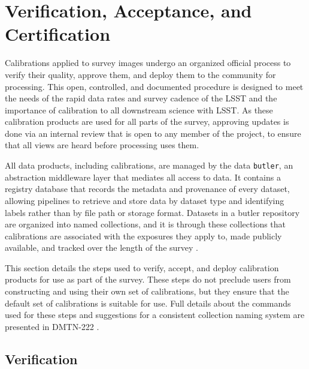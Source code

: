 \section{Verification, Acceptance, and Certification} \label{sec:verify-accept-certify}

Calibrations applied to survey images undergo an organized official process to verify their quality, approve them, and deploy them to the community for processing. This open, controlled, and documented procedure is designed to meet the needs of the rapid data rates and survey cadence of the LSST and the importance of calibration to all downstream science with LSST.
As these calibration products are used for all parts of the survey, approving updates is done via an internal review that is open to any member of the project, to ensure that all views are heard before processing uses them.

All data products, including calibrations, are managed by the data \texttt{butler}, an abstraction middleware layer that mediates all access to data. It contains a registry database that records the metadata and provenance of every dataset, allowing pipelines to retrieve and store data by dataset type and identifying labels rather than by file path or storage format.
Datasets in a butler repository are organized into named collections, and it is through these collections that calibrations are associated with the exposures they apply to, made publicly available, and tracked over the length of the survey \citep[see][for details]{2022SPIE12189E..11J}.

This section details the steps used to verify, accept, and deploy calibration products for use as part of the survey.
These steps do not preclude users from constructing and using their own set of calibrations, but they ensure that the default set of calibrations is suitable for use.
Full details about the commands used for these steps and suggestions for a consistent collection naming system are presented in DMTN-222 \citep{DMTN-222}.


\subsection{Verification} \label{sec:verify-accept-certify:verification}


